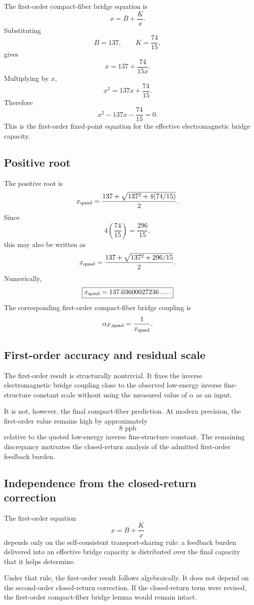 The first-order compact-fiber bridge equation is
\[
\boxed{
x=B+\frac{K}{x}.
}
\]
Substituting
\[
B=137,
\qquad
K=\frac{74}{15},
\]
gives
\[
x=137+\frac{74}{15x}.
\]
Multiplying by \(x\),
\[
x^2=137x+\frac{74}{15}.
\]
Therefore
\[
\boxed{
x^2-137x-\frac{74}{15}=0.
}
\]
This is the first-order fixed-point equation for the effective electromagnetic bridge capacity.

\subsection{Positive root}

The positive root is
\[
x_{\rm quad}
=
\frac{137+\sqrt{137^2+4(74/15)}}{2}.
\]
Since
\[
4\left(\frac{74}{15}\right)
=
\frac{296}{15},
\]
this may also be written as
\[
x_{\rm quad}
=
\frac{137+\sqrt{137^2+296/15}}{2}.
\]
Numerically,
\[
\boxed{
x_{\rm quad}=137.03600027236\ldots.
}
\]
The corresponding first-order compact-fiber bridge coupling is
\[
\alpha_{F,\rm quad}
=
\frac{1}{x_{\rm quad}}.
\]

\subsection{First-order accuracy and residual scale}

The first-order result is structurally nontrivial. It fixes the inverse electromagnetic bridge coupling close to the observed low-energy inverse fine-structure constant scale without using the measured value of \(\alpha\) as an input.

It is not, however, the final compact-fiber prediction. At modern precision, the first-order value remains high by approximately
\[
8\text{ ppb}
\]
relative to the quoted low-energy inverse fine-structure constant. The remaining discrepancy motivates the closed-return analysis of the admitted first-order feedback burden.

\subsection{Independence from the closed-return correction}

The first-order equation
\[
x=B+\frac{K}{x}
\]
depends only on the self-consistent transport-sharing rule: a feedback burden delivered into an effective bridge capacity is distributed over the final capacity that it helps determine.

Under that rule, the first-order result follows algebraically. It does not depend on the second-order closed-return correction. If the closed-return term were revised, the first-order compact-fiber bridge lemma would remain intact.